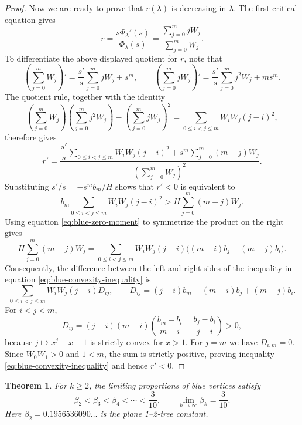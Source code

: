 \documentclass[10pt,a4paper]{amsart}
\newtheorem{theorem}{Theorem}[section]
\theoremstyle{remark}
\begin{document}
\begin{proof}
Now we are ready to prove that $r(\lambda)$ is decreasing in $\lambda$.
The first critical equation gives
\[
r=\frac{s\Phi_\lambda'(s)}{\Phi_\lambda(s)}
=\frac{\sum_{j=0}^m jW_j}{\sum_{j=0}^m W_j}.
\]
To differentiate the above displayed quotient for $r$, note that
\[
\left(\sum_{j=0}^m W_j\right)'
=\frac{s'}s\sum_{j=0}^m jW_j+s^m,
\qquad
\left(\sum_{j=0}^m jW_j\right)'
=\frac{s'}s\sum_{j=0}^m j^2W_j+ms^m.
\]
The quotient rule, together with the identity
\[
\left(\sum_{j=0}^m W_j\right)
\left(\sum_{j=0}^m j^2W_j\right)
-\left(\sum_{j=0}^m jW_j\right)^2
=\sum_{0\leq i<j\leq m}W_iW_j(j-i)^2,
\]
therefore gives
\[
r'=\frac{
\dfrac{s'}s\displaystyle\sum_{0\leq i<j\leq m}W_iW_j(j-i)^2
+s^m\displaystyle\sum_{j=0}^m(m-j)W_j
}{\left(\displaystyle\sum_{j=0}^m W_j\right)^2}.
\]
Substituting $s'/s=-s^m b_m/H$ shows that $r'<0$ is equivalent to
\begin{equation}\label{eq:blue-convexity-inequality}
b_m\sum_{0\leq i<j\leq m}W_iW_j(j-i)^2
>H\sum_{j=0}^m(m-j)W_j.
\end{equation}
Using equation \eqref{eq:blue-zero-moment} to symmetrize the product
on the right gives
\[
H\sum_{j=0}^m(m-j)W_j
=\sum_{0\leq i<j\leq m}W_iW_j(j-i)
\bigl((m-i)b_j-(m-j)b_i\bigr).
\]
Consequently, the difference between the left and right sides of the inequality in equation
\eqref{eq:blue-convexity-inequality} is
\[
\sum_{0\leq i<j\leq m}W_iW_j(j-i)D_{ij},
\qquad
D_{ij}=(j-i)b_m-(m-i)b_j+(m-j)b_i.
\]
For $i<j<m$,
\[
D_{ij}=(j-i)(m-i)
\left(\frac{b_m-b_i}{m-i}-\frac{b_j-b_i}{j-i}\right)>0,
\]
because $j\mapsto x^j-x+1$ is strictly convex for $x>1$.
For $j=m$ we have $D_{i,m}=0$. Since $W_0W_1>0$ and $1<m$,
the sum is strictly positive, proving inequality
\eqref{eq:blue-convexity-inequality} and hence $r'<0$.
\end{proof}

\begin{theorem}\label{blue-monotone}
For $k\geq2$, the limiting proportions of blue vertices satisfy
\[
\beta_2<\beta_3<\beta_4<\cdots<\frac3{10},
\qquad \lim_{k\to\infty}\beta_k=\frac3{10}.
\]
Here $\beta_2=0.1956536090\ldots$ is the plane 1--2-tree constant.
\end{theorem}
\end{document}
